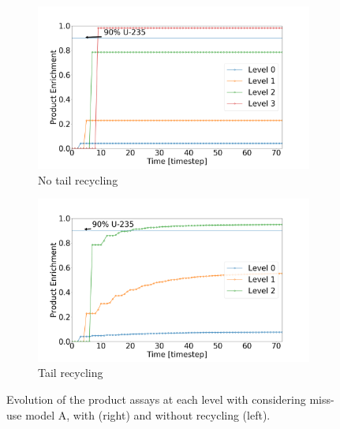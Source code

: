 \begin{figure}[h!]
    \centering
    \begin{subfigure}[t]{0.45\textwidth}
        \centering
        \includegraphics[scale=0.17]{NR_case1}
        \caption{No tail recycling}
        \label{sfig:case1_NR}
    \end{subfigure}%
    \begin{subfigure}[t]{0.45\textwidth}
        \centering
        \includegraphics[scale=0.17]{R_case1}
        \caption{Tail recycling}
        \label{sfig:case1_R}
    \end{subfigure}
    \caption{Evolution of the product assays at each level with considering
    miss-use model A, with (right) and without recycling (left).}
    \label{fig:case1}
\end{figure}


